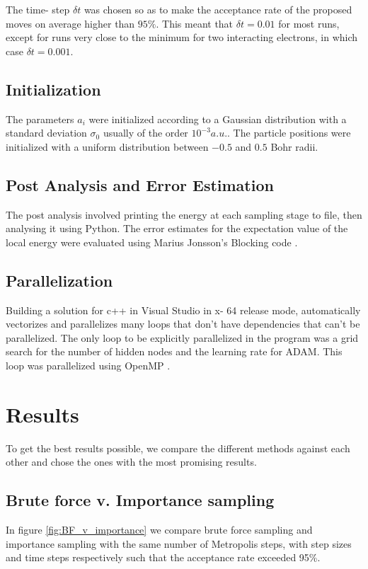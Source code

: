 \documentclass[11pt,a4paper,titlepage]{article}
\begin{document}
The time- step $\delta t$ was chosen so as to make the acceptance rate of the proposed moves on average higher than $95\%$. This meant that $\delta t = 0.01$ for most runs, except for runs very close to the minimum for two interacting electrons, in which case $\delta t = 0.001$.
\subsection{Initialization}
The parameters $a_i$ were initialized according to a Gaussian distribution with a standard deviation $\sigma_0$ usually of the order $10^{-3}a.u.$. The particle positions were initialized with a uniform distribution between $-0.5$ and $0.5$ Bohr radii.
\subsection{Post Analysis and Error Estimation}
The post analysis involved printing the energy at each sampling stage to file, then analysing it using Python. The error estimates for the expectation value of the local energy were evaluated using Marius Jonsson's Blocking code \cite{PhysRevE.98.043304}.
\subsection{Parallelization}
Building a solution for c++ in Visual Studio in x- 64 release mode, automatically vectorizes and parallelizes many loops that don't have dependencies that can't be parallelized. The only loop to be explicitly parallelized in the program was a grid search for the number of hidden nodes and the learning rate for ADAM. This loop was parallelized using OpenMP \cite{openmp08}. 



\section{Results}
To get the best results possible, we compare the different methods against each other and chose the ones with the most promising results.
\subsection{Brute force v. Importance sampling}
In figure \ref{fig:BF_v_importance} we compare brute force sampling and importance sampling with the same number of Metropolis steps, with step sizes and time steps respectively such that the acceptance rate exceeded 95\%.
\end{document}
